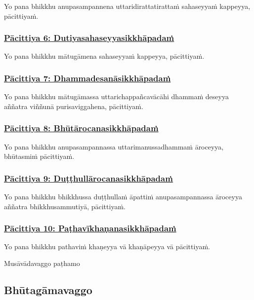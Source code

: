 Yo pana bhikkhu anupasampannena uttaridirattatirattaṁ sahaseyyaṁ kappeyya, pācittiyaṁ.

\subsubsection*{\hyperref[exp6]{Pācittiya 6: Dutiyasahaseyyasikkhāpadaṁ}}
\label{pac6}

Yo pana bhikkhu mātugāmena sahaseyyaṁ kappeyya, pācittiyaṁ.

\subsubsection*{\hyperref[exp7]{Pācittiya 7: Dhammadesanāsikkhāpadaṁ}}
\label{pac7}

Yo pana bhikkhu mātugāmassa uttarichappañcavācāhi dhammaṁ deseyya aññatra viññunā purisaviggahena, pācittiyaṁ.

\subsubsection*{\hyperref[exp8]{Pācittiya 8: Bhūtārocanasikkhāpadaṁ}}
\label{pac8}

Yo pana bhikkhu anupasampannassa uttarimanussadhammaṁ āroceyya, bhūtasmiṁ pācittiyaṁ.

\subsubsection*{\hyperref[exp9]{Pācittiya 9: Duṭṭhullārocanasikkhāpadaṁ}}
\label{pac9}

Yo pana bhikkhu bhikkhussa duṭṭhullaṁ āpattiṁ anupasampannassa āroceyya aññatra bhikkhusammutiyā, pācittiyaṁ.

\subsubsection*{\hyperref[exp10]{Pācittiya 10: Paṭhavīkhaṇanasikkhāpadaṁ}}
\label{pac10}

Yo pana bhikkhu pathaviṁ khaṇeyya vā khaṇāpeyya vā pācittiyaṁ.

\begin{center}
  Musāvādavaggo paṭhamo
\end{center}

\subsection{Bhūtagāmavaggo}
\vspace{0.2cm}

